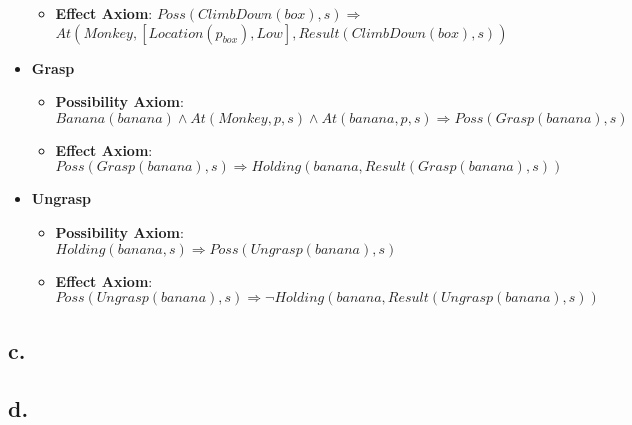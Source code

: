 \documentclass{article}
\begin{document}
\begin{itemize}
\begin{itemize}
                        \item \textbf{Effect Axiom}: $Poss(ClimbDown(box), s)\Rightarrow$\\
                            $At(Monkey, [Location(p_{box}), Low], Result(ClimbDown(box), s))$
                    \end{itemize}
                \item \textbf{Grasp}
                    \begin{itemize}
                        \item \textbf{Possibility Axiom}: $Banana(banana)\land At(Monkey, p, s)\land At(banana, p, s)\Rightarrow Poss(Grasp(banana), s)$
                        \item \textbf{Effect Axiom}: $Poss(Grasp(banana), s)\Rightarrow Holding(banana, Result(Grasp(banana), s))$
                    \end{itemize}
                \item \textbf{Ungrasp}
                    \begin{itemize}
                        \item \textbf{Possibility Axiom}: $Holding(banana, s)\Rightarrow Poss(Ungrasp(banana), s)$
                        \item \textbf{Effect Axiom}: $Poss(Ungrasp(banana), s)\Rightarrow \lnot Holding(banana, Result(Ungrasp(banana), s))$
                    \end{itemize}
            \end{itemize}
        \subsection{c.}
        \subsection{d.}
\end{document}
